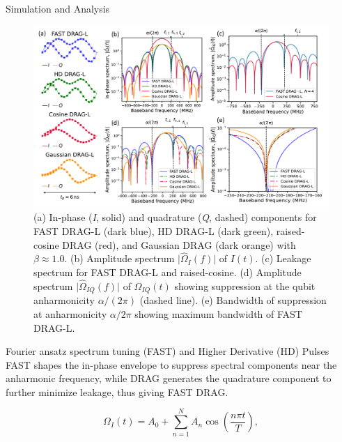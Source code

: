 \documentclass[final]{beamer}
\newlength{\colwidth}
\begin{document}
\begin{frame}[t]
\begin{columns}[t]
\begin{column}{\colwidth}
            \begin{block}{Simulation and Analysis}
                \begin{figure}
                    \centering
                    \includegraphics[width=0.9\linewidth]{Images_pdfs/IWQT-FAST&HD-leakage-spectrum.pdf}
                    \caption{
                        (a) In-phase (\textit{I}, solid) and quadrature (\textit{Q}, dashed) components for FAST DRAG-L (dark blue), HD DRAG-L (dark green), raised-cosine DRAG (red), and Gaussian DRAG (dark orange) with \(\beta \approx 1.0\).
                        (b) Amplitude spectrum \(\lvert \hat\Omega_I(f) \rvert\) of \(I(t)\).
                        (c) Leakage spectrum for FAST DRAG-L and raised-cosine.
                        (d) Amplitude spectrum \(\lvert \hat\Omega_{IQ}(f) \rvert\) of \(\Omega_{IQ}(t)\) showing suppression at the qubit anharmonicity \(\alpha/(2\pi)\) (dashed line).
                        (e) Bandwidth of suppression at anharmonicity \(\alpha/2\pi\) showing maximum bandwidth of FAST DRAG-L.
                    }
                \end{figure}
            \end{block}

            \begin{exampleblock}{Fourier ansatz spectrum tuning (FAST) and Higher Derivative (HD) Pulses}
                FAST shapes the in-phase envelope to suppress spectral components near the anharmonic frequency, while DRAG generates the quadrature component to further minimize leakage, thus giving FAST DRAG.

                \[
                \Omega_I(t) = A_0 + \sum_{n=1}^{N} A_n \cos\left(\frac{n\pi t}{T}\right),
                \]


\end{exampleblock}
\end{column}
\end{columns}
\end{frame}
\end{document}
